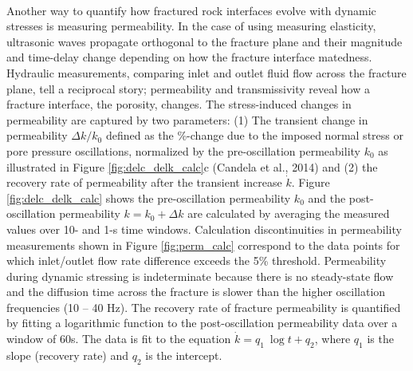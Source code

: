 \paragraph{}
Another way to quantify how fractured rock interfaces evolve with dynamic stresses is measuring permeability. In the case of using measuring elasticity, ultrasonic waves propagate orthogonal to the fracture plane and their magnitude and time-delay change depending on how the fracture interface matedness. Hydraulic measurements, comparing inlet and outlet fluid flow across the fracture plane, tell a reciprocal story; permeability and transmissivity reveal how a fracture interface, the porosity, changes. 
The stress-induced changes in permeability are captured by two parameters: (1) The transient change in permeability $ \Delta k/k_0 $ defined as the \%-change due to the imposed normal stress or pore pressure oscillations, normalized by the pre-oscillation permeability $ k_0 $ as illustrated in Figure \ref{fig:delc_delk_calc}c (Candela et al., 2014) and (2) the recovery rate of permeability after the transient increase $ \dot k $. 
Figure \ref{fig:delc_delk_calc} shows the pre-oscillation permeability $ k_0 $ and the post-oscillation permeability $ k = k_0 + \Delta k $ are calculated by averaging the measured values over 10- and 1-s time windows. Calculation discontinuities in permeability measurements shown in Figure \ref{fig:perm_calc} correspond to the data points for which inlet/outlet flow rate difference exceeds the 5\% threshold. Permeability during dynamic stressing is indeterminate because there is no steady-state flow and the diffusion time across the fracture is slower than the higher oscillation frequencies (10 -- 40 Hz). The recovery rate of fracture permeability is quantified by fitting a logarithmic function to the post-oscillation permeability data over a window of 60s. The data is fit to the equation $ \dot k = q_1\ \log{t} + q_2 $, where $q_1$ is the slope (recovery rate) and $q_2$ is the intercept. 

